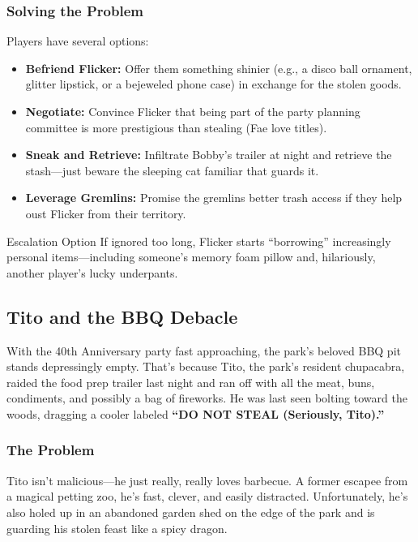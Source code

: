 \subsubsection{Solving the Problem}
Players have several options:
\begin{itemize}
    \item \textbf{Befriend Flicker:} Offer them something shinier (e.g., a disco ball ornament, glitter lipstick, or a bejeweled phone case) in exchange for the stolen goods.
    \item \textbf{Negotiate:} Convince Flicker that being part of the party planning committee is more prestigious than stealing (Fae love titles).
    \item \textbf{Sneak and Retrieve:} Infiltrate Bobby’s trailer at night and retrieve the stash—just beware the sleeping cat familiar that guards it.
    \item \textbf{Leverage Gremlins:} Promise the gremlins better trash access if they help oust Flicker from their territory.
\end{itemize}

\begin{CommentBox}{Escalation Option}
    If ignored too long, Flicker starts “borrowing” increasingly personal items—including someone’s memory foam pillow and, hilariously, another player’s lucky underpants.
\end{CommentBox}




\subsection{Tito and the BBQ Debacle}

With the 40th Anniversary party fast approaching, the park's beloved BBQ pit stands depressingly empty. That’s because Tito, the park’s resident chupacabra, raided the food prep trailer last night and ran off with all the meat, buns, condiments, and possibly a bag of fireworks. He was last seen bolting toward the woods, dragging a cooler labeled \textbf{“DO NOT STEAL (Seriously, Tito).”}

\subsubsection{The Problem}
Tito isn’t malicious—he just really, really loves barbecue. A former escapee from a magical petting zoo, he’s fast, clever, and easily distracted. Unfortunately, he’s also holed up in an abandoned garden shed on the edge of the park and is guarding his stolen feast like a spicy dragon.

